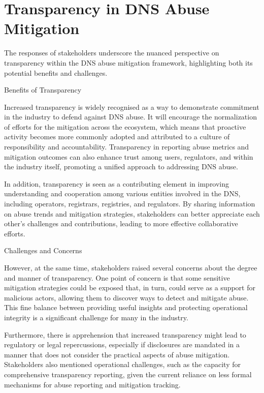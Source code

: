 \section{Transparency in DNS Abuse Mitigation} 

The responses of stakeholders underscore the nuanced perspective on transparency within the DNS abuse mitigation framework, highlighting both its potential benefits and challenges.

Benefits of Transparency

Increased transparency is widely recognised as a way to demonstrate commitment in the industry to defend against DNS abuse. It will encourage the normalization of efforts for the mitigation across the ecosystem, which means that proactive activity becomes more commonly adopted and attributed to a culture of responsibility and accountability. Transparency in reporting abuse metrics and mitigation outcomes can also enhance trust among users, regulators, and within the industry itself, promoting a unified approach to addressing DNS abuse.

In addition, transparency is seen as a contributing element in improving understanding and cooperation among various entities involved in the DNS, including operators, registrars, registries, and regulators. By sharing information on abuse trends and mitigation strategies, stakeholders can better appreciate each other's challenges and contributions, leading to more effective collaborative efforts.


Challenges and Concerns

However, at the same time, stakeholders raised several concerns about the degree and manner of transparency. One point of concern is that some sensitive mitigation strategies could be exposed that, in turn, could serve as a support for malicious actors, allowing them to discover ways to detect and mitigate abuse. This fine balance between providing useful insights and protecting operational integrity is a significant challenge for many in the industry.

Furthermore, there is apprehension that increased transparency might lead to regulatory or legal repercussions, especially if disclosures are mandated in a manner that does not consider the practical aspects of abuse mitigation. Stakeholders also mentioned operational challenges, such as the capacity for comprehensive transparency reporting, given the current reliance on less formal mechanisms for abuse reporting and mitigation tracking.


